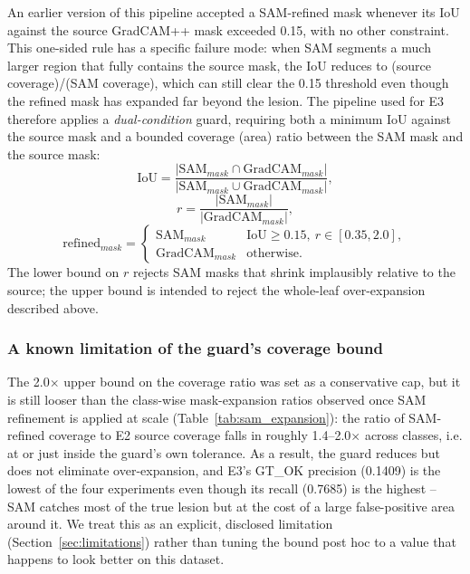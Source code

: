 \documentclass[final,5p,times,twocolumn,authoryear]{elsarticle}
\begin{document}
An earlier version of this pipeline accepted a SAM-refined mask whenever its IoU against the source GradCAM++ mask exceeded 0.15, with no other constraint. This one-sided rule has a specific failure mode: when SAM segments a much larger region that fully contains the source mask, the IoU reduces to (source coverage)/(SAM coverage), which can still clear the 0.15 threshold even though the refined mask has expanded far beyond the lesion. The pipeline used for E3 therefore applies a \emph{dual-condition} guard, requiring both a minimum IoU against the source mask and a bounded coverage (area) ratio between the SAM mask and the source mask:
\begin{equation}
\text{IoU} = \frac{|\text{SAM}_{mask} \cap \text{GradCAM}_{mask}|}{|\text{SAM}_{mask} \cup \text{GradCAM}_{mask}|},
\end{equation}
\begin{equation}
r = \frac{|\text{SAM}_{mask}|}{|\text{GradCAM}_{mask}|},
\end{equation}
\begingroup\footnotesize
\begin{equation}
\text{refined}_{mask} = \begin{cases}
\text{SAM}_{mask} & \text{IoU}\geq0.15,\ r\in[0.35,2.0], \\
\text{GradCAM}_{mask} & \text{otherwise.}
\end{cases}
\end{equation}
\endgroup
The lower bound on $r$ rejects SAM masks that shrink implausibly relative to the source; the upper bound is intended to reject the whole-leaf over-expansion described above.

\subsubsection{A known limitation of the guard's coverage bound}

The 2.0$\times$ upper bound on the coverage ratio was set as a conservative cap, but it is still looser than the class-wise mask-expansion ratios observed once SAM refinement is applied at scale (Table~\ref{tab:sam_expansion}): the ratio of SAM-refined coverage to E2 source coverage falls in roughly 1.4--2.0$\times$ across classes, i.e. at or just inside the guard's own tolerance. As a result, the guard reduces but does not eliminate over-expansion, and E3's GT\_OK precision (0.1409) is the lowest of the four experiments even though its recall (0.7685) is the highest -- SAM catches most of the true lesion but at the cost of a large false-positive area around it. We treat this as an explicit, disclosed limitation (Section~\ref{sec:limitations}) rather than tuning the bound post hoc to a value that happens to look better on this dataset.
\end{document}
